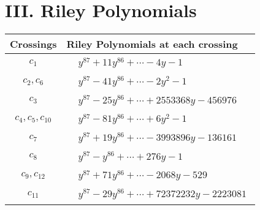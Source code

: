 \documentclass[1p]{elsarticle_modified}
\theoremstyle{definition}
\begin{document}
\centering \section*{ III. Riley Polynomials}
\begin{tabular}{m{50pt}|m{274pt}}
Crossings & \hspace{64pt}Riley Polynomials at each crossing \\
\hline $$\begin{aligned}c_{1}\end{aligned}$$&$\begin{aligned}
&y^{87}+11 y^{86}+\cdots-4 y-1
\end{aligned}$\\
\hline $$\begin{aligned}c_{2},c_{6}\end{aligned}$$&$\begin{aligned}
&y^{87}-41 y^{86}+\cdots-2 y^2-1
\end{aligned}$\\
\hline $$\begin{aligned}c_{3}\end{aligned}$$&$\begin{aligned}
&y^{87}-25 y^{86}+\cdots+2553368 y-456976
\end{aligned}$\\
\hline $$\begin{aligned}c_{4},c_{5},c_{10}\end{aligned}$$&$\begin{aligned}
&y^{87}-81 y^{86}+\cdots+6 y^2-1
\end{aligned}$\\
\hline $$\begin{aligned}c_{7}\end{aligned}$$&$\begin{aligned}
&y^{87}+19 y^{86}+\cdots-3993896 y-136161
\end{aligned}$\\
\hline $$\begin{aligned}c_{8}\end{aligned}$$&$\begin{aligned}
&y^{87}- y^{86}+\cdots+276 y-1
\end{aligned}$\\
\hline $$\begin{aligned}c_{9},c_{12}\end{aligned}$$&$\begin{aligned}
&y^{87}+71 y^{86}+\cdots-2068 y-529
\end{aligned}$\\
\hline $$\begin{aligned}c_{11}\end{aligned}$$&$\begin{aligned}
&y^{87}-29 y^{86}+\cdots+72372232 y-2223081
\end{aligned}$\\
\hline
\end{tabular}
\vskip 2pc
\end{document}
